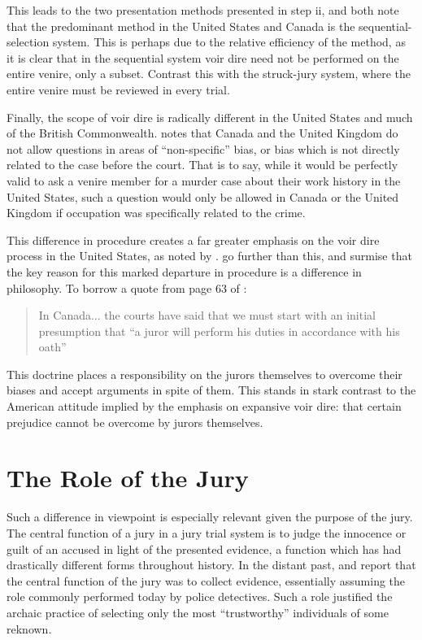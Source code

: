 This leads to the two presentation methods presented in step ii, \cite{ford2010} and \cite{vandykejurysel} both note that the
predominant method in the United States and Canada is the sequential-selection system. This is perhaps due to the relative
efficiency of the method, as it is clear that in the sequential system voir dire need not be performed on the entire venire, only
a subset. Contrast this with the struck-jury system, where the entire venire must be reviewed in every trial.

Finally, the scope of voir dire is radically different in the United States and much of the British
Commonwealth. \cite{vandykejurysel} notes that Canada and the United Kingdom do not allow questions in areas of ``non-specific''
bias, or bias which is not directly related to the case before the court. That is to say, while it would be perfectly valid to ask
a venire member for a murder case about their work history in the United States, such a question would only be allowed in Canada
or the United Kingdom if occupation was specifically related to the crime.

This difference in procedure creates a far greater emphasis on the voir dire process in the United States, as noted by
\cite{hansvidjudging}. \citeauthor{hansvidjudging} go further than this, and surmise that the key reason for this marked departure
in procedure is a difference in philosophy. To borrow a quote from page 63 of \cite{hansvidjudging}:

\begin{quote}
  \centering
  In Canada... the courts have said that we must start with an initial presumption that ``a juror will perform his
  duties in accordance with his oath''
\end{quote}

This doctrine places a responsibility on the jurors themselves to overcome their biases and accept arguments in spite of
them. This stands in stark contrast to the American attitude implied by the emphasis on expansive voir dire: that certain
prejudice cannot be overcome by jurors themselves.

\section{The Role of the Jury} \label{sec:rolejur}

Such a difference in viewpoint is especially relevant given the purpose of the jury. The central function of a jury in a jury
trial system is to judge the innocence or guilt of an accused in light of the presented evidence, a function which has had
drastically different forms throughout history. In the distant past, \cite{vonmosch1921} and \cite{hoffman1997} report that the
central function of the jury was to collect evidence, essentially assuming the role commonly performed today by police
detectives. Such a role justified the archaic practice of selecting only the most ``trustworthy'' individuals of some reknown.

